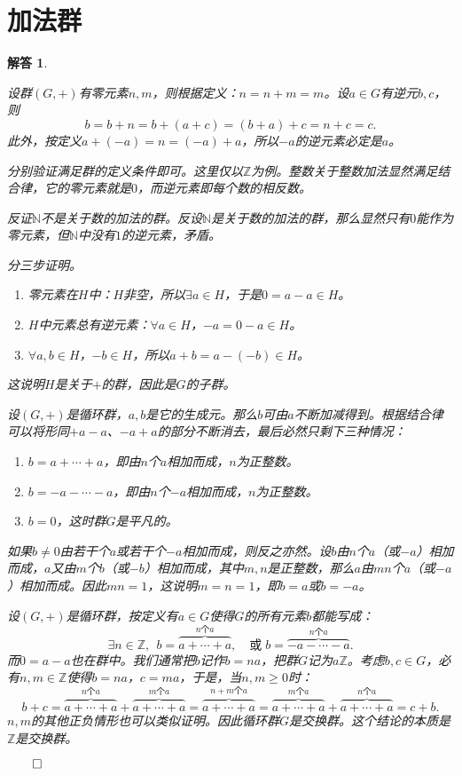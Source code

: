 \documentclass[12pt,UTF8]{ctexbook}
\theoremstyle{exercisestyle}
\theoremstyle{solutionstyle}
\newtheorem*{solution*}{解答}
\newenvironment{solution}
  {\begin{solution*}}
  {\hfill\ensuremath{\qed}\end{solution*}}
\begin{document}
\section{加法群}
\begin{solution}
    \begin{subquestions}
        \item 设群$(G, +)$有零元素$n, m$，则根据定义：$n = n + m = m$。设$a\in G$有逆元$b, c$，则
        $$b = b + n = b + (a + c) = (b + a) + c = n + c = c. $$
        此外，按定义$a + (-a) = n = (-a) + a$，所以$-a$的逆元素必定是$a$。
        \item 分别验证满足群的定义条件即可。这里仅以$\mathbb{Z}$为例。整数关于整数加法显然满足结合律，它的零元素就是$0$，而逆元素即每个数的相反数。
        
        反证$\mathbb{N}$不是关于数的加法的群。反设$\mathbb{N}$是关于数的加法的群，那么显然只有$0$能作为零元素，但$\mathbb{N}$中没有$1$的逆元素，矛盾。
        \item 分三步证明。
        \begin{enumerate}[label=\arabic*.]
            \item 零元素在$H$中：$H$非空，所以$\exists a \in H$，于是$0 = a - a\in H$。
            \item $H$中元素总有逆元素：$\forall a \in H$，$-a = 0 - a \in H$。
            \item $\forall a, b\in H$，$-b\in H$，所以$a + b = a - (-b) \in H$。
        \end{enumerate}
        这说明$H$是关于$+$的群，因此是$G$的子群。
        \item 设$(G, +)$是循环群，$a, b$是它的生成元。那么$b$可由$a$不断加减得到。根据结合律可以将形同$+ a - a$、$-a + a$的部分不断消去，最后必然只剩下三种情况：
        \begin{enumerate}[label=\arabic*.]
            \item $b = a + \cdots + a$，即由$n$个$a$相加而成，$n$为正整数。
            \item $b = -a - \cdots - a$，即由$n$个$-a$相加而成，$n$为正整数。
            \item $b = 0$，这时群$G$是平凡的。
        \end{enumerate}
        如果$b\neq 0$由若干个$a$或若干个$-a$相加而成，则反之亦然。设$b$由$n$个$a$（或$-a$）相加而成，$a$又由$m$个$b$（或$-b$）相加而成，其中$m,n$是正整数，那么$a$由$mn$个$a$（或$-a$）相加而成。因此$mn = 1$，这说明$m = n = 1$，即$b = a$或$b = -a$。
        \item 设$(G, +)$是循环群，按定义有$a\in G$使得$G$的所有元素$b$都能写成：
        $$\exists n \in \mathbb{Z}, \;\, b = \overbrace{a + \cdots + a}^{n\text{个}a}, \quad \mbox{或}\; b = \overbrace{-a - \cdots - a}^{n\text{个}a}.$$
        而$0 = a - a$也在群中。我们通常把$b$记作$b = na$，把群$G$记为$a\mathbb{Z}$。考虑$b, c\in G$，必有$n,m\in \mathbb{Z}$使得$b = na$，$c = ma$，于是，当$n,m \geqslant 0$时：
        $$ b + c = \overbrace{a + \cdots + a}^{n\text{个}a} + \overbrace{a + \cdots + a}^{m\text{个}a} = \overbrace{a + \cdots + a}^{n + m\text{个}a} = \overbrace{a + \cdots + a}^{m\text{个}a} + \overbrace{a + \cdots + a}^{n\text{个}a} = c + b.$$
        $n,m$的其他正负情形也可以类似证明。因此循环群$G$是交换群。这个结论的本质是$\mathbb{Z}$是交换群。


\end{subquestions}
\end{solution}
\end{document}
